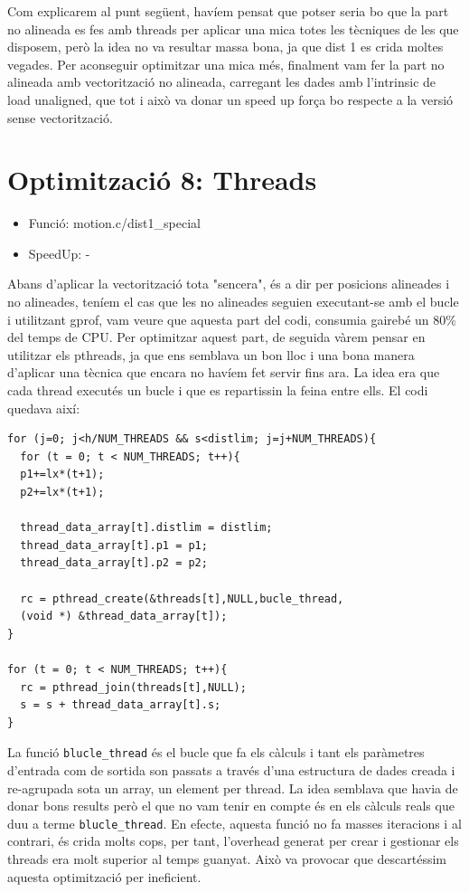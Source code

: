 Com explicarem al punt següent, havíem pensat que potser seria bo que la part no alineada es fes amb threads per aplicar una mica totes les tècniques de les que disposem, però la idea no va resultar massa bona, ja que dist 1 es crida moltes vegades. Per aconseguir optimitzar una mica més, finalment vam fer la part no alineada amb vectorització no alineada, carregant les dades amb l'intrinsic de load unaligned, que tot i això va donar un speed up força bo respecte a la versió sense vectorització.

\section{Optimitzaci\'o 8: Threads}
\begin{itemize}
\item{Funció: motion.c/dist1\_special}
\item{SpeedUp: -}
\end{itemize}

Abans d'aplicar la vectorització tota "sencera", és a dir per posicions alineades i no alineades, teníem el cas que les no alineades seguien executant-se amb el bucle i utilitzant gprof, vam veure que aquesta part del codi, consumia gairebé un 80\% del temps de CPU. Per optimitzar aquest part, de seguida vàrem pensar en utilitzar els pthreads, ja que ens semblava un bon lloc i una bona manera d'aplicar una tècnica que encara no havíem fet servir fins ara. La idea era que cada thread executés un bucle i que es repartissin la feina entre ells. El codi quedava així:

\begin{lstlisting}
for (j=0; j<h/NUM_THREADS && s<distlim; j=j+NUM_THREADS){   
  for (t = 0; t < NUM_THREADS; t++){
  p1+=lx*(t+1);
  p2+=lx*(t+1);

  thread_data_array[t].distlim = distlim;
  thread_data_array[t].p1 = p1;
  thread_data_array[t].p2 = p2;

  rc = pthread_create(&threads[t],NULL,bucle_thread,
  (void *) &thread_data_array[t]);
}

for (t = 0; t < NUM_THREADS; t++){
  rc = pthread_join(threads[t],NULL);
  s = s + thread_data_array[t].s;
}		 	
\end{lstlisting}

La funció \texttt{blucle\_thread} és el bucle que fa els càlculs i tant els paràmetres d'entrada com de sortida son passats a través d'una estructura de dades creada i re-agrupada sota un array, un element per thread. La idea semblava que havia de donar bons results però el que no vam tenir en compte és en els càlculs reals que duu a terme \texttt{blucle\_thread}. En efecte, aquesta funció no fa masses iteracions i al contrari, és crida molts cops, per tant, l'overhead generat per crear i gestionar els threads era molt superior al temps guanyat. Això va provocar que descartéssim aquesta optimització per ineficient.

